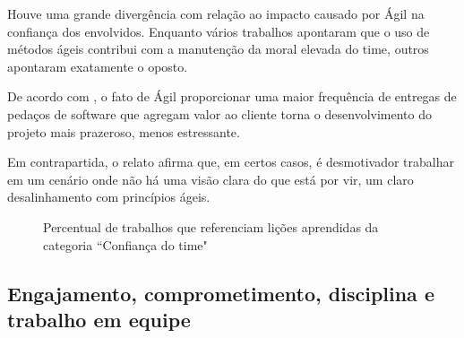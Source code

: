 Houve uma grande divergência com relação ao impacto causado por Ágil na confiança dos envolvidos. Enquanto vários trabalhos apontaram que o uso de métodos ágeis contribui com a manutenção da moral elevada do time, outros apontaram exatamente o oposto.

De acordo com \cite{Asnawi2012}, o fato de Ágil proporcionar uma maior frequência de entregas de pedaços de software que agregam valor ao cliente torna o desenvolvimento do projeto mais prazeroso, menos estressante.

Em contrapartida, o relato \cite{Nokia2013} afirma que, em certos casos, é desmotivador trabalhar em um cenário onde não há uma visão clara do que está por vir, um claro desalinhamento com princípios ágeis.

\begin{figure}[H]
	\centering
	\captionsetup{justification=centering}
	\caption{Percentual de trabalhos que referenciam lições aprendidas da categoria ``Confiança do time"}
	\label{fig:confianca}
\end{figure}

\subsection{Engajamento, comprometimento, disciplina e trabalho em equipe}

